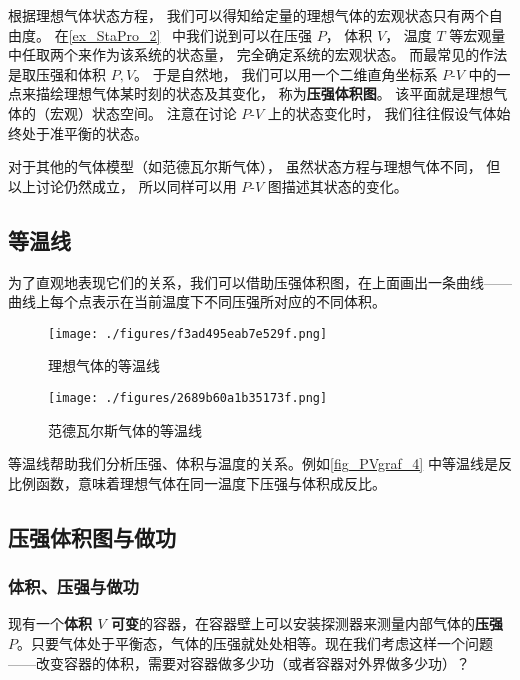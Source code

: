 
\begin{issues}
\issueDraft
\end{issues}


根据理想气体状态方程， 我们可以得知给定量的理想气体的宏观状态只有两个自由度。 在\autoref{ex_StaPro_2}~ 中我们说到可以在压强 $P$， 体积 $V$， 温度 $T$ 等宏观量中任取两个来作为该系统的状态量， 完全确定系统的宏观状态。 而最常见的作法是取压强和体积 $P,V$。 于是自然地， 我们可以用一个二维直角坐标系 $P$-$V$ 中的一点来描绘理想气体某时刻的状态及其变化， 称为\textbf{压强体积图}。 该平面就是理想气体的（宏观）状态空间。 注意在讨论 $P$-$V$ 上的状态变化时， 我们往往假设气体始终处于准平衡的状态。

对于其他的气体模型（如范德瓦尔斯气体）， 虽然状态方程与理想气体不同， 但以上讨论仍然成立， 所以同样可以用 $P$-$V$ 图描述其状态的变化。


\subsection{等温线}
为了直观地表现它们的关系，我们可以借助压强体积图，在上面画出一条曲线——曲线上每个点表示在当前温度下不同压强所对应的不同体积。
\begin{figure}[ht]
\centering
\texttt{[image: ./figures/f3ad495eab7e529f.png]}
\caption{理想气体的等温线} \label{fig_PVgraf_4}
\end{figure}
\begin{figure}[ht]
\centering
\texttt{[image: ./figures/2689b60a1b35173f.png]}
\caption{范德瓦尔斯气体的等温线} \label{fig_PVgraf_3}
\end{figure}

等温线帮助我们分析压强、体积与温度的关系。例如\autoref{fig_PVgraf_4} 中等温线是反比例函数，意味着理想气体在同一温度下压强与体积成反比。

\subsection{压强体积图与做功}

\subsubsection{体积、压强与做功}
现有一个\textbf{体积 $V$ 可变}的容器，在容器壁上可以安装探测器来测量内部气体的\textbf{压强 $P$}。只要气体处于平衡态，气体的压强就处处相等。现在我们考虑这样一个问题——改变容器的体积，需要对容器做多少功（或者容器对外界做多少功）？

